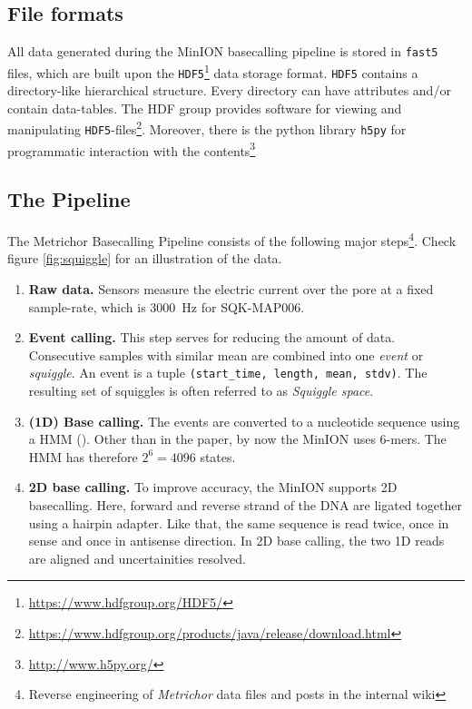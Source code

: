 \documentclass[]{scrartcl}
\begin{document}
\subsection{File formats}
All data generated during the MinION basecalling pipeline is stored in \texttt{fast5} files, which are built upon the \texttt{HDF5}\footnote{\url{https://www.hdfgroup.org/HDF5/}} data storage format. \texttt{HDF5} contains a directory-like hierarchical structure. Every directory can have attributes and/or contain data-tables. The HDF group provides software for viewing and manipulating \texttt{HDF5}-files\footnote{\url{https://www.hdfgroup.org/products/java/release/download.html}}. Moreover, there is the python library \texttt{h5py} for programmatic interaction with the contents\footnote{\url{http://www.h5py.org/}}


\subsection{The Pipeline}
The Metrichor Basecalling Pipeline consists of the following major steps\footnote{Reverse engineering of \textit{Metrichor} data files and posts in the internal wiki}. Check figure \ref{fig:squiggle} for an illustration of the data. 

\begin{enumerate}
\item \textbf{Raw data.} Sensors measure the electric current over the pore at a fixed sample-rate, which is \SI{3000}{\hertz} for SQK-MAP006.
\item \textbf{Event calling.} This step serves for reducing the amount of data. Consecutive samples with similar mean are combined into one \textit{event} or \textit{squiggle}. An event is a tuple \texttt{(start\_time, length, mean, stdv)}. The resulting set of squiggles is often referred to as \textit{Squiggle space}. 
\item \textbf{(1D) Base calling.} The events are converted to a nucleotide sequence using a HMM (\cite{Timp2012a}). Other than in the paper, by now the MinION uses 6-mers. The HMM has therefore $2^6 = 4096$ states. 
\item \textbf{2D base calling.} To improve accuracy, the MinION supports 2D basecalling. Here, forward and reverse strand of the DNA are ligated together using a hairpin adapter. Like that, the same sequence is read twice, once in sense and once in antisense direction. In 2D base calling, the two 1D reads are aligned and uncertainities resolved.   
\end{enumerate}
\end{document}
